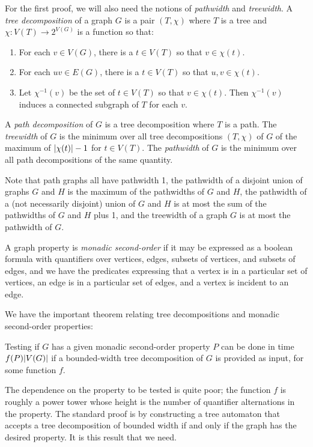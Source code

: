 \documentclass{article}
\DeclarePairedDelimiter{\abs}{\lvert}{\rvert}
\begin{document}
For the first proof, we will also need the notions of \textit{pathwidth} and \textit{treewidth}. A \textit{tree decomposition} of a graph $G$ is a pair $(T,\chi)$ where $T$ is a tree and $\chi:V(T)\to 2^{V(G)}$ is a function so that:
\begin{enumerate}
    \item For each $v\in V(G)$, there is a $t\in V(T)$ so that $v\in \chi(t)$.
    \item For each $uv\in E(G)$, there is a $t\in V(T)$ so that $u,v\in \chi(t)$.
    \item Let $\chi^{-1}(v)$ be the set of $t\in V(T)$ so that $v\in \chi(t)$. Then $\chi^{-1}(v)$ induces a connected subgraph of $T$ for each $v$.
\end{enumerate}

A \textit{path decomposition} of $G$ is a tree decomposition where $T$ is a path. The \textit{treewidth} of $G$ is the minimum over all tree decompositions $(T,\chi)$ of $G$ of the maximum of $\abs{\chi(t)} - 1$ for $t\in V(T)$. The \textit{pathwidth} of $G$ is the minimum over all path decompositions of the same quantity.

Note that path graphs all have pathwidth 1, the pathwidth of a disjoint union of graphs $G$ and $H$ is the maximum of the pathwidths of $G$ and $H$, the pathwidth of a (not necessarily disjoint) union of $G$ and $H$ is at most the sum of the pathwidths of $G$ and $H$ plus 1, and the treewidth of a graph $G$ is at most the pathwidth of $G$.

A graph property is \textit{monadic second-order} if it may be expressed as a boolean formula with quantifiers over vertices, edges, subsets of vertices, and subsets of edges, and we have the predicates expressing that a vertex is in a particular set of vertices, an edge is in a particular set of edges, and a vertex is incident to an edge.

We have the important theorem relating tree decompositions and monadic second-order properties:

\begin{theorem*}
Testing if $G$ has a given monadic second-order property $P$ can be done in time $f(P)\abs{V(G)}$ if a bounded-width tree decomposition of $G$ is provided as input, for some function $f$.
\end{theorem*}

The dependence on the property to be tested is quite poor; the function $f$ is roughly a power tower whose height is the number of quantifier alternations in the property. The standard proof is by constructing a tree automaton that accepts a tree decomposition of bounded width if and only if the graph has the desired property. It is this result that we need.
\end{document}
